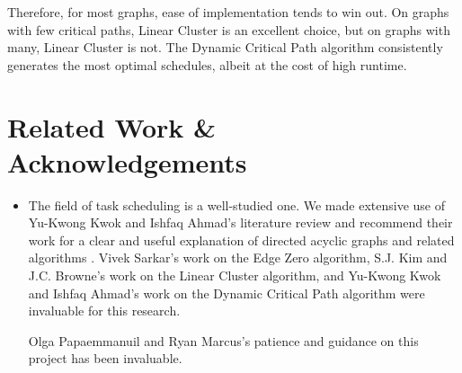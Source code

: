 \documentclass[11pt, oneside]{article}   	%
\begin{document}
Therefore, for most graphs, ease of implementation tends to win out. On graphs with few critical paths, Linear Cluster is an excellent choice, but on graphs with many, Linear Cluster is not. The Dynamic Critical Path algorithm consistently generates the most optimal schedules, albeit at the cost of high runtime.

\section{Related Work \& Acknowledgements}

\begin{itemize}
\item The field of task scheduling is a well-studied one. We made extensive use of Yu-Kwong Kwok and Ishfaq Ahmad's literature review and recommend their work for a clear and useful explanation of directed acyclic graphs and related algorithms \cite{lit-review}. Vivek Sarkar's work on the Edge Zero \cite{edge-zero} algorithm, S.J. Kim and J.C. Browne's work on the Linear Cluster algorithm, and Yu-Kwong Kwok and Ishfaq Ahmad's work on the Dynamic Critical Path algorithm were invaluable for this research.

Olga Papaemmanuil and Ryan Marcus's patience and guidance on this project has been invaluable.

\end{itemize}
\end{document}
